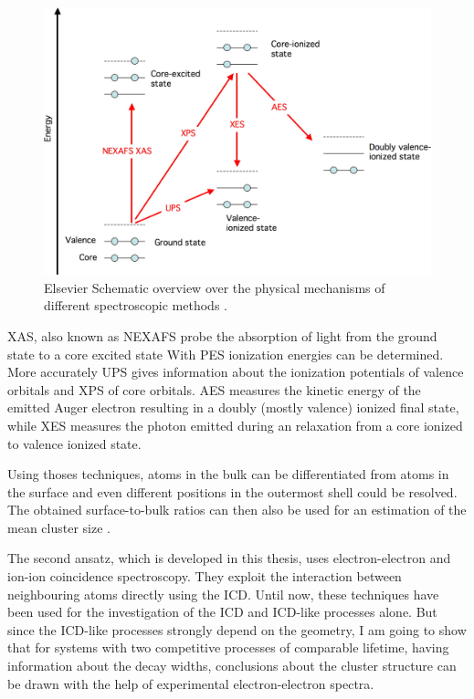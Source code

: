 \begin{figure}[h]
  \centering
  \includegraphics[scale=1.0]{pics/overview_spectroscopies.jpeg}
  \caption{Elsevier Schematic overview over the physical mechanisms of different
           spectroscopic methods \cite{Bjorneholm09}.}
  \label{figure:overview_spectroscopies}
\end{figure}

\ac{XAS}, also known as \ac{NEXAFS} probe the absorption of light
from the ground state to a core excited state With \ac{PES} ionization
energies can be determined. More accurately \ac{UPS} gives information
about the ionization potentials of valence orbitals and \ac{XPS}
of core orbitals.
\ac{AES} measures the kinetic energy of the emitted Auger electron
resulting in a doubly (mostly valence) ionized final state, while
\ac{XES} measures the photon emitted during an relaxation from
a core ionized to valence ionized state.

Using thoses techniques, atoms in the bulk can be differentiated from atoms
in the surface and even different positions in the
outermost shell could be resolved. The obtained surface-to-bulk ratios
can then also be used for an estimation of the mean cluster size
\cite{Bjorneholm09,Knop98,Hatsui05}.

The second ansatz, which is developed in this thesis, uses electron-electron
and ion-ion coincidence spectroscopy.
They exploit the interaction between neighbouring atoms
directly using the ICD.
Until now, these techniques
have been used for the investigation of the
\ac{ICD} and \ac{ICD}-like processes alone.
But since the ICD-like processes strongly depend on the geometry, I am going to
show that for systems with two competitive processes of comparable lifetime,
having information about the decay widths, conclusions about
the cluster structure can be drawn with the help of experimental
electron-electron spectra.

